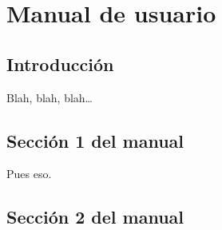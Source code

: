 %

\chapter{Manual de usuario}
\label{cha:manual-de-usuario}

\section{Introducción}
\label{sec:intro-manual-de-usuario}

Blah, blah, blah\ldots


\section{Sección 1 del manual}
\label{sec:manual-1}

Pues eso.


\section{Sección 2 del manual}
\label{sec:manual-2}




